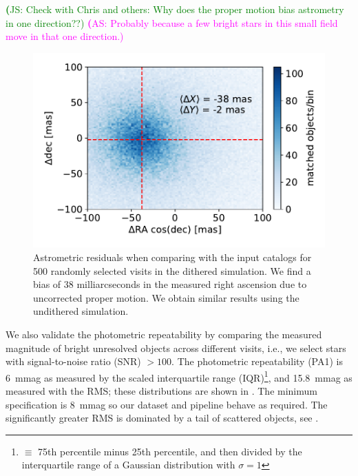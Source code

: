 \documentclass[twocolumn]{aastex62}
\newcommand{\as}[1]{{\textcolor{magenta}{{\textbf (AS: #1)}}}}
\newcommand{\js}[1]{{\textcolor{green}{{\textbf (JS: #1)}}}}
\begin{document}
\js{Check with Chris and others: Why does the proper motion bias astrometry in one direction??}
\as{Probably because a few bright stars in this small field move in that one direction.}

\begin{figure}
\centering
\includegraphics[width=0.9\columnwidth]{astrometric_residuals_single_visit_2d}
\caption{Astrometric residuals when comparing with the input catalogs for 500 randomly selected visits in the dithered simulation. We find a bias of 38 milliarcseconds in the measured right ascension due to uncorrected proper motion. We obtain similar results using the undithered simulation.}
\label{fig:AA1}
\end{figure}

We also validate the photometric repeatability by comparing the measured magnitude of bright unresolved objects across different visits, i.e., we select stars with signal-to-noise ratio (SNR) $> 100$. The photometric repeatability (PA1) is 6~mmag as measured by the scaled interquartile range (IQR)\footnote{$\equiv$ 75th percentile minus 25th percentile, and then divided by the interquartile range of a Gaussian distribution with $\sigma=1$}, and 15.8~mmag as measured with the RMS; these distributions are shown in . The minimum specification is 8~mmag so our dataset and pipeline behave as required. The significantly greater RMS is dominated by a tail of scattered objects, see .
\end{document}
